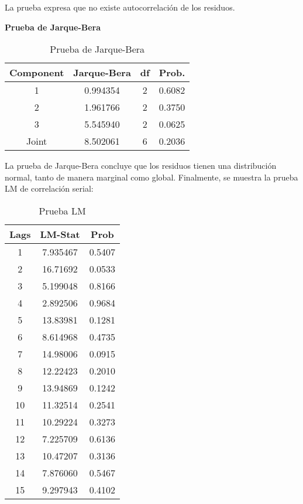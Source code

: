 La prueba expresa que no existe autocorrelaci\'{o}n de los residuos.\newline

\textbf{Prueba de Jarque-Bera}\newline

\begin{table}[H]
\centering
\begin{tabular}{cccc}\hline\hline
Component & Jarque-Bera & df & Prob. \\ \hline\hline
1 & 0.994354 & 2 & 0.6082 \\
2 & 1.961766 & 2 & 0.3750 \\
3 & 5.545940 & 2 & 0.0625 \\ \hline\hline
Joint & 8.502061 & 6 & 0.2036 \\ \hline\hline
\end{tabular}
\caption{Prueba de Jarque-Bera}
\end{table}

La prueba de Jarque-Bera concluye que los residuos tienen una distribuci\'{o}n normal, tanto de manera marginal como global. Finalmente, se muestra la prueba LM de correlaci\'{o}n serial:
 
\begin{table}[H]
\centering
\begin{tabular}{|c|c|c|}\hline
Lags & LM-Stat & Prob \\ \hline
1 & 7.935467 & 0.5407 \\ \hline
2 & 16.71692 & 0.0533 \\ \hline
3 & 5.199048 & 0.8166 \\ \hline
4 & 2.892506 & 0.9684 \\ \hline
5 & 13.83981 & 0.1281 \\ \hline
6 & 8.614968 & 0.4735 \\ \hline
7 & 14.98006 & 0.0915 \\ \hline
8 & 12.22423 & 0.2010 \\ \hline
9 & 13.94869 & 0.1242 \\ \hline
10 & 11.32514 & 0.2541 \\ \hline
11 & 10.29224 & 0.3273 \\ \hline
12 & 7.225709 & 0.6136 \\ \hline
13 & 10.47207 & 0.3136 \\ \hline
14 & 7.876060 & 0.5467 \\ \hline
15 & 9.297943 & 0.4102 \\ \hline
\end{tabular}
\caption{Prueba LM}
\end{table}

